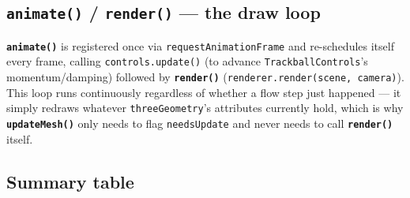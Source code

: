 \documentclass[11pt]{article}
\newcommand{\code}[1]{\texttt{#1}}
\newcommand{\func}[1]{\texttt{\textbf{#1}}}
\begin{document}
\subsection{\func{animate()} / \func{render()} --- the draw loop}
\func{animate()} is registered once via \code{requestAnimationFrame} and re-schedules
itself every frame, calling \code{controls.update()} (to advance
\code{TrackballControls}'s momentum/damping) followed by \func{render()}
(\code{renderer.render(scene, camera)}). This loop runs continuously regardless of whether
a flow step just happened --- it simply redraws whatever \code{threeGeometry}'s attributes
currently hold, which is why \func{updateMesh()} only needs to flag \code{needsUpdate} and
never needs to call \func{render()} itself.

\subsection*{Summary table}
\end{document}
